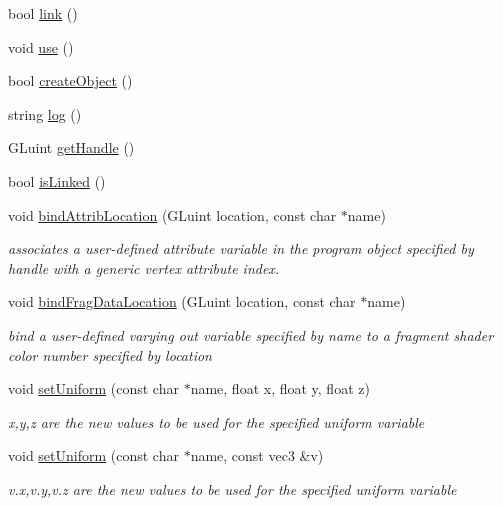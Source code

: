 \begin{DoxyCompactItemize}
bool \hyperlink{class_g_l_s_l_program_a79c92c1c9a1a09c0a091cd52a8f602c6}{link} ()
\item 
void \hyperlink{class_g_l_s_l_program_a0ea2aeacb4361b37f145246430134bb6}{use} ()
\item 
bool \hyperlink{class_g_l_s_l_program_a07aaaf69f5837deb59a7551dc323f667}{create\+Object} ()
\item 
string \hyperlink{class_g_l_s_l_program_ac03cbf803fbcc60d3ff4b3b6d4ecbaa6}{log} ()
\item 
G\+Luint \hyperlink{class_g_l_s_l_program_a37f5a6e85135bc51ed4a94712bacde76}{get\+Handle} ()
\item 
bool \hyperlink{class_g_l_s_l_program_ad0d1efa38db415e35d9a329a93828815}{is\+Linked} ()
\item 
void \hyperlink{class_g_l_s_l_program_a54589ae245f6fac51f79a6617c91240b}{bind\+Attrib\+Location} (G\+Luint location, const char $\ast$name)
\begin{DoxyCompactList}\small\item\em associates a user-\/defined attribute variable in the program object specified by handle with a generic vertex attribute index. \end{DoxyCompactList}\item 
void \hyperlink{class_g_l_s_l_program_a44270f942de121ef2493e26f1226a902}{bind\+Frag\+Data\+Location} (G\+Luint location, const char $\ast$name)
\begin{DoxyCompactList}\small\item\em bind a user-\/defined varying out variable specified by name to a fragment shader color number specified by location \end{DoxyCompactList}\item 
void \hyperlink{class_g_l_s_l_program_a85e4c896c2a8524cb4574a064a2dfb0c}{set\+Uniform} (const char $\ast$name, float x, float y, float z)
\begin{DoxyCompactList}\small\item\em x,y,z are the new values to be used for the specified uniform variable \end{DoxyCompactList}\item 
void \hyperlink{class_g_l_s_l_program_a8784d794a6dbe97903d85bd0135a61c8}{set\+Uniform} (const char $\ast$name, const vec3 \&v)
\begin{DoxyCompactList}\small\item\em v.\+x,v.\+y,v.\+z are the new values to be used for the specified uniform variable \end{DoxyCompactList}\item 

\end{DoxyCompactItemize}
